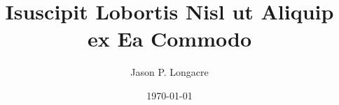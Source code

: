 \documentclass{revtex4}
\begin{document}

\title{Isuscipit Lobortis Nisl ut Aliquip ex Ea Commodo}


\author{Jason P. Longacre}


\date{\today}


\setlength{\topmargin}{0in}

\maketitle

\end{document}
